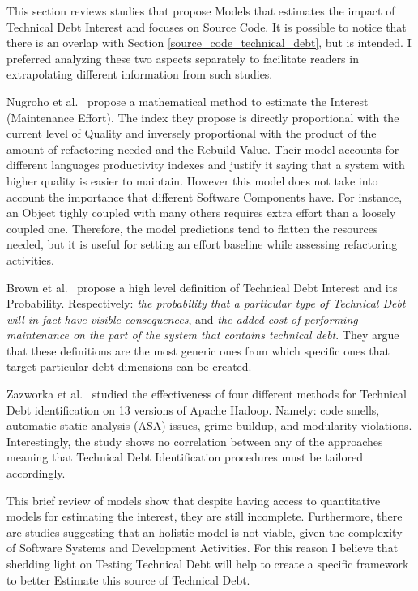 This section reviews studies that propose Models that estimates the impact of Technical Debt Interest and focuses on Source Code. It is possible to notice that there is an overlap with Section \ref{source_code_technical_debt}, but is intended. I preferred analyzing these two aspects separately to facilitate readers in extrapolating different information from such studies.

Nugroho et al.\ \cite{technicalDebtInterest} propose a mathematical method to estimate the Interest (Maintenance Effort). The index they propose is directly proportional with the current level of Quality and inversely proportional with the product of the amount of refactoring needed and the Rebuild Value. Their model accounts for different languages productivity indexes and justify it saying that a system with higher quality is easier to maintain. However this model does not take into account the importance that different Software Components have. For instance, an Object tighly coupled with many others requires extra effort than a loosely coupled one. Therefore, the model predictions tend to flatten the resources needed, but it is useful for setting an effort baseline while assessing refactoring activities.

Brown et al.\ \cite{td_current_vs_optimal_quality} propose a high level definition of Technical Debt Interest and its Probability. Respectively: \textit{the probability that a particular type of Technical Debt will in fact have visible consequences}, and \textit{the added cost of performing maintenance on the part of the system that contains technical debt}. They argue that these definitions are the most generic ones from which specific ones that target particular debt-dimensions can be created.

Zazworka et al.\ \cite{4_methods_to_identify_td} studied the effectiveness of four different methods for Technical Debt identification on 13 versions of Apache Hadoop. Namely: code smells, automatic static analysis (ASA) issues, grime
buildup, and modularity violations. Interestingly, the study shows no correlation between any of the approaches meaning that Technical Debt Identification procedures must be tailored accordingly.

This brief review of models show that despite having access to quantitative models for estimating the interest, they are still incomplete. Furthermore, there are studies suggesting that an holistic model is not viable, given the complexity of Software Systems and Development Activities. For this reason I believe that shedding light on Testing Technical Debt will help to create a specific framework to better Estimate this source of Technical Debt.





